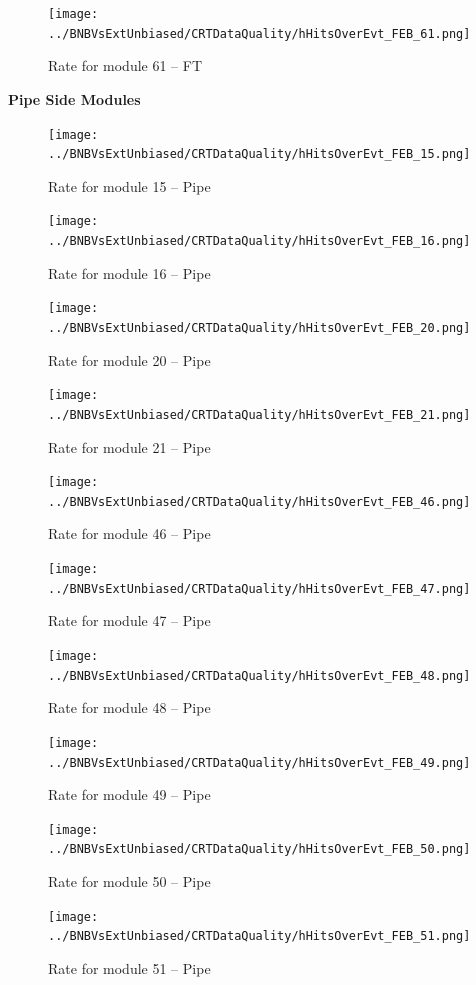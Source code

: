 \begin{figure}[h!]
\centering
\texttt{[image: ../BNBVsExtUnbiased/CRTDataQuality/hHitsOverEvt\_FEB\_61.png]}
\caption{Rate for module 61 -- FT}
\label{Annual61}
\end{figure}
\clearpage
{\bf Pipe Side Modules} 
\begin{figure}[h!]
\centering
\texttt{[image: ../BNBVsExtUnbiased/CRTDataQuality/hHitsOverEvt\_FEB\_15.png]}
\caption{Rate for module 15 -- Pipe}
\label{Annual15}
\end{figure}
\begin{figure}[h!]
\centering
\texttt{[image: ../BNBVsExtUnbiased/CRTDataQuality/hHitsOverEvt\_FEB\_16.png]}
\caption{Rate for module 16 -- Pipe}
\label{Annual16}
\end{figure}
\begin{figure}[h!]
\centering
\texttt{[image: ../BNBVsExtUnbiased/CRTDataQuality/hHitsOverEvt\_FEB\_20.png]}
\caption{Rate for module 20 -- Pipe}
\label{Annual20}
\end{figure}
\begin{figure}[h!]
\centering
\texttt{[image: ../BNBVsExtUnbiased/CRTDataQuality/hHitsOverEvt\_FEB\_21.png]}
\caption{Rate for module 21 -- Pipe}
\label{Annual21}
\end{figure}
\begin{figure}[h!]
\centering
\texttt{[image: ../BNBVsExtUnbiased/CRTDataQuality/hHitsOverEvt\_FEB\_46.png]}
\caption{Rate for module 46 -- Pipe}
\label{Annual46}
\end{figure}
\begin{figure}[h!]
\centering
\texttt{[image: ../BNBVsExtUnbiased/CRTDataQuality/hHitsOverEvt\_FEB\_47.png]}
\caption{Rate for module 47 -- Pipe}
\label{Annual47}
\end{figure}
\begin{figure}[h!]
\centering
\texttt{[image: ../BNBVsExtUnbiased/CRTDataQuality/hHitsOverEvt\_FEB\_48.png]}
\caption{Rate for module 48 -- Pipe}
\label{Annual48}
\end{figure}
\begin{figure}[h!]
\centering
\texttt{[image: ../BNBVsExtUnbiased/CRTDataQuality/hHitsOverEvt\_FEB\_49.png]}
\caption{Rate for module 49 -- Pipe}
\label{Annual49}
\end{figure}
\begin{figure}[h!]
\centering
\texttt{[image: ../BNBVsExtUnbiased/CRTDataQuality/hHitsOverEvt\_FEB\_50.png]}
\caption{Rate for module 50 -- Pipe}
\label{Annual50}
\end{figure}
\begin{figure}[h!]
\centering
\texttt{[image: ../BNBVsExtUnbiased/CRTDataQuality/hHitsOverEvt\_FEB\_51.png]}
\caption{Rate for module 51 -- Pipe}
\label{Annual51}
\end{figure}
